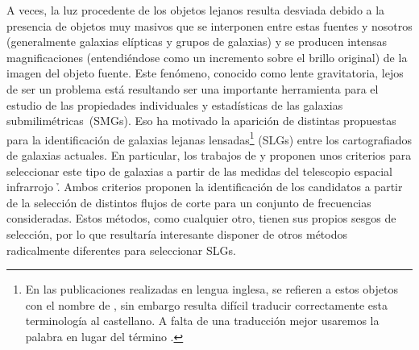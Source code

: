A veces, la luz procedente de los objetos lejanos resulta desviada debido a la presencia de objetos muy masivos que se interponen entre estas fuentes y nosotros (generalmente galaxias elípticas y grupos de galaxias) y se producen intensas magnificaciones (entendiéndose como un incremento sobre el brillo original) de la imagen del objeto fuente. Este fenómeno, conocido como lente gravitatoria, lejos de ser un problema está resultando ser una importante herramienta para el estudio de las propiedades individuales y estadísticas de las galaxias submilimétricas~(SMGs). Eso ha motivado la aparición de distintas propuestas para la identificación de galaxias lejanas lensadas\footnote{En las publicaciones realizadas en lengua inglesa, se refieren a estos objetos con el nombre de , sin embargo resulta difícil traducir correctamente esta terminología al castellano. A falta de una traducción mejor usaremos la palabra  en lugar del término .} (SLGs) entre los cartografiados de galaxias actuales. En particular, los trabajos de \cite{article:Negrello_2010} y \cite{article:Nuevo_2012} proponen unos criterios para seleccionar este tipo de galaxias a partir de las medidas del telescopio espacial infrarrojo \h. Ambos criterios proponen la identificación de los candidatos a partir de la selección de distintos flujos de corte para un conjunto de frecuencias consideradas. Estos métodos, como cualquier otro, tienen sus propios sesgos de selección, por lo que resultaría interesante disponer de otros métodos radicalmente diferentes para seleccionar SLGs.

